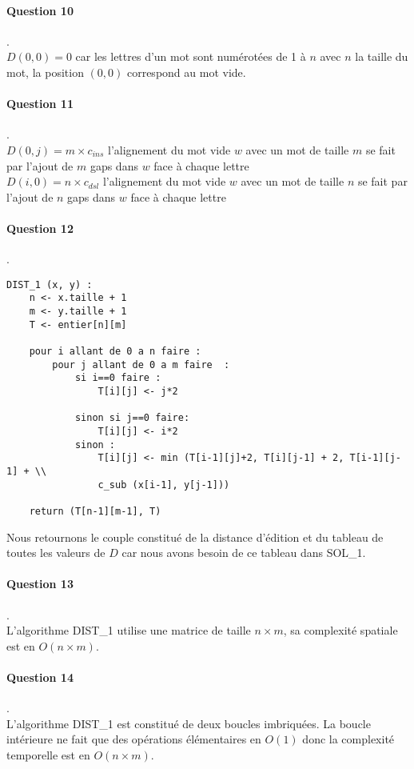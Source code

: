 \paragraph{Question 10}.\\
 $D(0, 0) = 0$ car les lettres d'un mot sont numérotées de 1 à $n$ avec $n$ la taille du mot, la position $(0,0)$ correspond au mot vide.
\paragraph{Question 11}.\\
$D(0, j) = m\times c_{ins} $ l'alignement du mot vide $w$ avec un mot de taille $m$ se fait par l'ajout de $m$ gaps dans $w$ face à chaque lettre\\
$D(i, 0) = n\times c_{dsl} $ l'alignement du mot vide $w$ avec un mot de taille $n$ se fait par l'ajout de $n$ gaps dans $w$ face à chaque lettre
\paragraph{Question 12}.\\
\begin{lstlisting}
DIST_1 (x, y) :
    n <- x.taille + 1
    m <- y.taille + 1
    T <- entier[n][m]

    pour i allant de 0 a n faire :
        pour j allant de 0 a m faire  :
            si i==0 faire :
                T[i][j] <- j*2

            sinon si j==0 faire:
                T[i][j] <- i*2
            sinon :
                T[i][j] <- min (T[i-1][j]+2, T[i][j-1] + 2, T[i-1][j-1] + \\
                c_sub (x[i-1], y[j-1]))

    return (T[n-1][m-1], T)
\end{lstlisting}
Nous retournons le couple constitué de la distance d'édition et du tableau de toutes les valeurs de $D$ car nous avons besoin de ce tableau dans SOL\_1.
\paragraph{Question 13}.\\
L'algorithme DIST\_1 utilise une matrice de taille $n \times m$, sa complexité spatiale est en $O(n\times m)$.
\paragraph{Question 14}.\\
L'algorithme DIST\_1 est constitué de deux boucles imbriquées. La boucle intérieure ne fait que des opérations élémentaires en $O(1)$ donc la complexité temporelle est en $O(n\times m)$.
